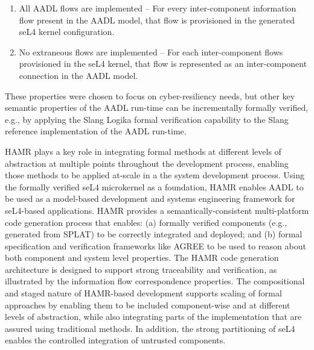 \begin{enumerate}
\item All AADL flows are implemented -- For every inter-component information
flow present in the AADL model, that flow is provisioned in the
generated seL4 kernel configuration.
\item No extraneous flows are implemented -- For
each inter-component flows provisioned in the seL4 kernel, that
flow is represented as an inter-component connection in the
AADL model.   
\end{enumerate}
These properties were chosen to focus on
cyber-resiliency needs, but other
key semantic properties of the AADL run-time can be incrementally
formally verified, e.g., by applying the Slang Logika formal
verification capability to the Slang reference implementation of the
AADL run-time.  

HAMR plays a key role in integrating formal methods
at different levels of abstraction at multiple points throughout
the development process, enabling those methods to be applied
at-scale in a the system development process.   Using the
formally verified seL4 microkernel as a foundation, HAMR enables
AADL to be used as a model-based development and systems
engineering framework for seL4-based applications.
HAMR provides a semantically-consistent multi-platform code
generation process that enables: (a) formally verified components
(e.g., generated from SPLAT) to be correctly integrated and
deployed; and (b) formal specification and verification frameworks
like AGREE to be used to reason about both component and system
level properties.   The HAMR code generation architecture is
designed to support strong traceability and verification, as
illustrated by the information flow correspondence properties.  
The compositional and staged nature
of HAMR-based development supports scaling of formal approaches
by enabling them to be included component-wise and at
different levels of abstraction, while
also integrating parts of the implementation that are assured
using traditional methods.   In addition, the strong partitioning
of seL4 enables the controlled integration of untrusted components.



